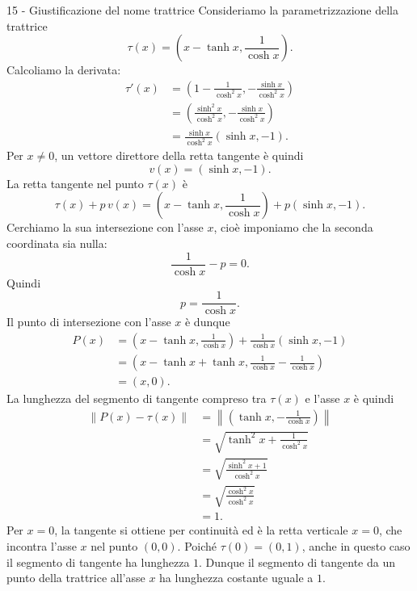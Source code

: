 \documentclass[a4paper]{article}
\begin{document}
\begin{snippetsolution}{15 - Giustificazione del nome trattrice}
    Consideriamo la parametrizzazione della trattrice
    \[
        \tau(x)=
        \left(
            x-\tanh x,
            \frac{1}{\cosh x}
        \right).
    \]
    Calcoliamo la derivata:
    \begin{align*}
        \tau'(x)
        &=
        \left(
            1-\frac{1}{\cosh^2 x},
            -\frac{\sinh x}{\cosh^2 x}
        \right)\\
        &=
        \left(
            \frac{\sinh^2 x}{\cosh^2 x},
            -\frac{\sinh x}{\cosh^2 x}
        \right)\\
        &=
        \frac{\sinh x}{\cosh^2 x}
        \left(
            \sinh x,
            -1
        \right).
    \end{align*}
    Per \(x\neq0\), un vettore direttore della retta tangente è quindi
    \[
        v(x)=\left(\sinh x,-1\right).
    \]
    La retta tangente nel punto \(\tau(x)\) è
    \[
        \tau(x)+p\,v(x)
        =
        \left(
            x-\tanh x,
            \frac{1}{\cosh x}
        \right)
        +
        p\left(\sinh x,-1\right).
    \]
    Cerchiamo la sua intersezione con l'asse \(x\), cioè imponiamo che la seconda coordinata sia nulla:
    \[
        \frac{1}{\cosh x}-p=0.
    \]
    Quindi
    \[
        p=\frac{1}{\cosh x}.
    \]
    Il punto di intersezione con l'asse \(x\) è dunque
    \begin{align*}
        P(x)
        &=
        \left(
            x-\tanh x,
            \frac{1}{\cosh x}
        \right)
        +
        \frac{1}{\cosh x}
        \left(
            \sinh x,
            -1
        \right)\\
        &=
        \left(
            x-\tanh x+\tanh x,
            \frac{1}{\cosh x}-\frac{1}{\cosh x}
        \right)\\
        &=
        (x,0).
    \end{align*}
    La lunghezza del segmento di tangente compreso tra \(\tau(x)\) e l'asse \(x\) è quindi
    \begin{align*}
        \left\|P(x)-\tau(x)\right\|
        &=
        \left\|
        \left(
            \tanh x,
            -\frac{1}{\cosh x}
        \right)
        \right\|\\
        &=
        \sqrt{
            \tanh^2x+\frac{1}{\cosh^2x}
        }\\
        &=
        \sqrt{
            \frac{\sinh^2x+1}{\cosh^2x}
        }\\
        &=
        \sqrt{
            \frac{\cosh^2x}{\cosh^2x}
        }\\
        &=
        1.
    \end{align*}
    Per \(x=0\), la tangente si ottiene per continuità ed è la retta verticale \(x=0\), che incontra l'asse \(x\) nel punto \((0,0)\). Poiché \(\tau(0)=(0,1)\), anche in questo caso il segmento di tangente ha lunghezza \(1\).
    Dunque il segmento di tangente da un punto della trattrice all'asse \(x\) ha lunghezza costante uguale a \(1\).
\end{snippetsolution}
\end{document}
